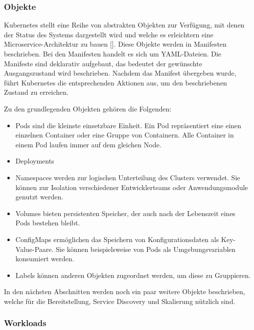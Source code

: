 \subsubsection{Objekte}

Kubernetes stellt eine Reihe von abstrakten Objekten zur Verfügung, mit denen der Status des Systems dargestellt wird und welche es erleichtern eine Microservice-Architektur zu bauen [\cite[S. 13]{hightowerKubernetes2018}]. Diese Objekte werden in Manifesten beschrieben. Bei den Manifesten handelt es sich um YAML-Dateien. Die Manifeste sind deklarativ aufgebaut, das bedeutet der gewünschte Ausgangszustand wird beschrieben. Nachdem das Manifest übergeben wurde, führt Kubernetes die entsprechenden Aktionen aus, um den beschriebenen Zustand zu erreichen.

Zu den grundlegenden Objekten gehören die Folgenden:
\begin{itemize}
\item Pods sind die kleinste einsetzbare Einheit. Ein Pod repräsentiert eine einen einzelnen Container oder eine Gruppe von Containern. Alle Container in einem Pod laufen immer auf dem gleichen Node.
\item Deployments
\item Namespaces werden zur logischen Unterteilung des Clusters verwendet. Sie können zur Isolation verschiedener Entwicklerteams oder Anwendungsmodule genutzt werden.
\item Volumes bieten persistenten Speicher, der auch nach der Lebenszeit eines Pods bestehen bleibt.
\item ConfigMaps ermöglichen das Speichern von Konfigurationsdaten als Key-Value-Paare. Sie können beispielsweise von Pods als Umgebungsvariablen konsumiert werden.
\item Labels können anderen Objekten zugeordnet werden, um diese zu Gruppieren.
\end{itemize}

In den nächsten Abschnitten werden noch ein paar weitere Objekte beschrieben, welche für die Bereitstellung, Service Discovery und Skalierung nützlich sind.

\subsubsection{Workloads}



